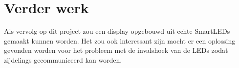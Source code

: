 \documentclass{article}
\begin{document}
\section{Verder werk}
Als vervolg op dit project zou een display opgebouwd uit echte SmartLEDs gemaakt kunnen worden. Het zou ook interessant zijn mocht er een oplossing gevonden worden voor het probleem met de invalshoek van de LEDs zodat zijdelings gecommuniceerd kan worden.



\end{document}
